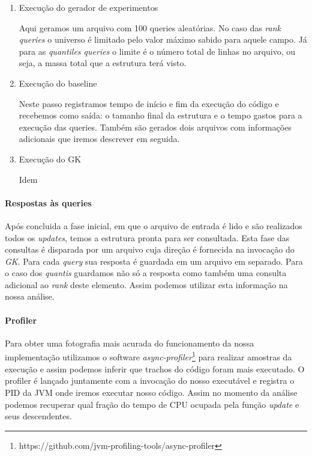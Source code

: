 \documentclass[11pt]{article}
\begin{document}
\begin{enumerate}
  \item Execução do gerador de experimentos

        Aqui geramos um arquivo com 100 queries aleatórias. No caso das \emph{rank queries} o universo é limitado pelo valor máximo sabido para aquele campo. Já para as \emph{quantiles queries} o limite é o número total de linhas no arquivo, ou seja, a massa total que a estrutura terá visto.

  \item Execução do baseline

        Neste passo registramos tempo de início e fim da execução do código e recebemos como saída: o tamanho final da estrutura e o tempo gastos para a execução das queries. Também são gerados dois arquivos com informações adicionais que iremos descrever em seguida.

  \item Execução do GK

        Idem

\end{enumerate}

\paragraph{Respostas às queries}
Após concluida a fase inicial, em que o arquivo de entrada é lido e são realizados todos os \emph{updates}, temos a estrutura pronta para ser consultada. Esta fase das consultas é disparada por um arquivo cuja direção é fornecida na invocação do \emph{GK}. Para cada \emph{query} sua resposta é guardada em um arquivo em separado. Para o caso dos \emph{quantis} guardamos não só a resposta como também uma consulta adicional ao \emph{rank} deste elemento. Assim podemos utilizar esta informação na nossa análise.

\paragraph{Profiler}
Para obter uma fotografia mais acurada do funcionamento da nossa implementação utilizamos o software \emph{async-profiler}\footnote{https://github.com/jvm-profiling-tools/async-profiler} para realizar amostras da execução e assim podemos inferir que trachos do código foram mais executado. O profiler é lançado juntamente com a invocação do nosso executável e registra o PID da JVM onde iremos executar nosso código. Assim no momento da análise podemos recuperar qual fração do tempo de CPU ocupada pela função \emph{update} e seus descendentes.
\end{document}
